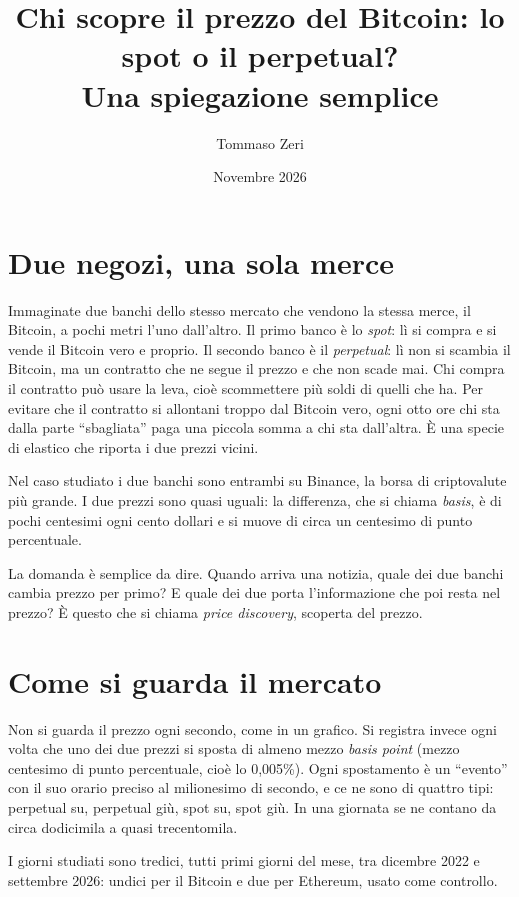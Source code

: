 \documentclass[a4paper,11pt]{article}
\title{Chi scopre il prezzo del Bitcoin: lo spot o il perpetual?\\[0.3em]\large Una spiegazione semplice}
\author{Tommaso Zeri}
\date{Novembre 2026}
\begin{document}
\maketitle

\section*{Due negozi, una sola merce}

Immaginate due banchi dello stesso mercato che vendono la stessa merce, il Bitcoin, a pochi metri l'uno dall'altro. Il primo banco è lo \emph{spot}: lì si compra e si vende il Bitcoin vero e proprio. Il secondo banco è il \emph{perpetual}: lì non si scambia il Bitcoin, ma un contratto che ne segue il prezzo e che non scade mai. Chi compra il contratto può usare la leva, cioè scommettere più soldi di quelli che ha. Per evitare che il contratto si allontani troppo dal Bitcoin vero, ogni otto ore chi sta dalla parte \enquote{sbagliata} paga una piccola somma a chi sta dall'altra. È una specie di elastico che riporta i due prezzi vicini.

Nel caso studiato i due banchi sono entrambi su Binance, la borsa di criptovalute più grande. I due prezzi sono quasi uguali: la differenza, che si chiama \emph{basis}, è di pochi centesimi ogni cento dollari e si muove di circa un centesimo di punto percentuale.

La domanda è semplice da dire. Quando arriva una notizia, quale dei due banchi cambia prezzo per primo? E quale dei due porta l'informazione che poi resta nel prezzo? È questo che si chiama \emph{price discovery}, scoperta del prezzo.

\section*{Come si guarda il mercato}

Non si guarda il prezzo ogni secondo, come in un grafico. Si registra invece ogni volta che uno dei due prezzi si sposta di almeno mezzo \emph{basis point} (mezzo centesimo di punto percentuale, cioè lo 0,005\%). Ogni spostamento è un \enquote{evento} con il suo orario preciso al milionesimo di secondo, e ce ne sono di quattro tipi: perpetual su, perpetual giù, spot su, spot giù. In una giornata se ne contano da circa dodicimila a quasi trecentomila.

I giorni studiati sono tredici, tutti primi giorni del mese, tra dicembre 2022 e settembre 2026: undici per il Bitcoin e due per Ethereum, usato come controllo.
\end{document}

